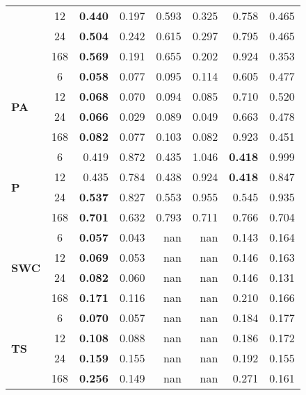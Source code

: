 \begin{table}
\begin{tabular}{p{2.1cm}c|rr|rr|rr}
 & 12 & \bfseries 0.440 & 0.197 & 0.593 & 0.325 & 0.758 & 0.465 \\
 & 24 & \bfseries 0.504 & 0.242 & 0.615 & 0.297 & 0.795 & 0.465 \\
 & 168 & \bfseries 0.569 & 0.191 & 0.655 & 0.202 & 0.924 & 0.353 \\
\cline{1-8}
\multirow[c]{4}{*}{\parbox{2.1cm}{\textbf{PA}}} & 6 & \bfseries 0.058 & 0.077 & 0.095 & 0.114 & 0.605 & 0.477 \\
 & 12 & \bfseries 0.068 & 0.070 & 0.094 & 0.085 & 0.710 & 0.520 \\
 & 24 & \bfseries 0.066 & 0.029 & 0.089 & 0.049 & 0.663 & 0.478 \\
 & 168 & \bfseries 0.082 & 0.077 & 0.103 & 0.082 & 0.923 & 0.451 \\
\cline{1-8}
\multirow[c]{4}{*}{\parbox{2.1cm}{\textbf{P}}} & 6 & 0.419 & 0.872 & 0.435 & 1.046 & \bfseries 0.418 & 0.999 \\
 & 12 & 0.435 & 0.784 & 0.438 & 0.924 & \bfseries 0.418 & 0.847 \\
 & 24 & \bfseries 0.537 & 0.827 & 0.553 & 0.955 & 0.545 & 0.935 \\
 & 168 & \bfseries 0.701 & 0.632 & 0.793 & 0.711 & 0.766 & 0.704 \\
\cline{1-8}
\multirow[c]{4}{*}{\parbox{2.1cm}{\textbf{SWC}}} & 6 & \bfseries 0.057 & 0.043 & nan & nan & 0.143 & 0.164 \\
 & 12 & \bfseries 0.069 & 0.053 & nan & nan & 0.146 & 0.163 \\
 & 24 & \bfseries 0.082 & 0.060 & nan & nan & 0.146 & 0.131 \\
 & 168 & \bfseries 0.171 & 0.116 & nan & nan & 0.210 & 0.166 \\
\cline{1-8}
\multirow[c]{4}{*}{\parbox{2.1cm}{\textbf{TS}}} & 6 & \bfseries 0.070 & 0.057 & nan & nan & 0.184 & 0.177 \\
 & 12 & \bfseries 0.108 & 0.088 & nan & nan & 0.186 & 0.172 \\
 & 24 & \bfseries 0.159 & 0.155 & nan & nan & 0.192 & 0.155 \\
 & 168 & \bfseries 0.256 & 0.149 & nan & nan & 0.271 & 0.161 \\
\cline{1-8}
\bottomrule
\end{tabular}
\end{table}
